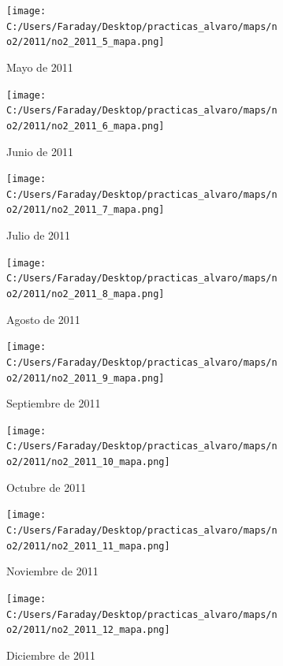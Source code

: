 \documentclass[12pt]{article}
\begin{document}
\newpage

\begin{figure}[H]
\centering
\begin{subfigure}[h]{0.45\textwidth}
\texttt{[image: C:/Users/Faraday/Desktop/practicas\_alvaro/maps/no2/2011/no2\_2011\_5\_mapa.png]}
\caption{Mayo de 2011}
\label{fig:map-mon-1-5-2011}
\end{subfigure}
%
\begin{subfigure}[H]{0.45\textwidth}
\texttt{[image: C:/Users/Faraday/Desktop/practicas\_alvaro/maps/no2/2011/no2\_2011\_6\_mapa.png]}
\caption{Junio de 2011}
\label{fig:map-mon-1-6-2011}
\end{subfigure}
\caption{}
\end{figure}

\begin{figure}[H]
\centering
\begin{subfigure}[h]{0.45\textwidth}
\texttt{[image: C:/Users/Faraday/Desktop/practicas\_alvaro/maps/no2/2011/no2\_2011\_7\_mapa.png]}
\caption{Julio de 2011}
\label{fig:map-mon-1-7-2011}
\end{subfigure}
%
\begin{subfigure}[H]{0.45\textwidth}
\texttt{[image: C:/Users/Faraday/Desktop/practicas\_alvaro/maps/no2/2011/no2\_2011\_8\_mapa.png]}
\caption{Agosto de 2011}
\label{fig:map-mon-1-8-2011}
\end{subfigure}
\caption{}
\end{figure}

\begin{figure}[H]
\centering
\begin{subfigure}[h]{0.45\textwidth}
\texttt{[image: C:/Users/Faraday/Desktop/practicas\_alvaro/maps/no2/2011/no2\_2011\_9\_mapa.png]}
\caption{Septiembre de 2011}
\label{fig:map-mon-1-9-2011}
\end{subfigure}
%
\begin{subfigure}[H]{0.45\textwidth}
\texttt{[image: C:/Users/Faraday/Desktop/practicas\_alvaro/maps/no2/2011/no2\_2011\_10\_mapa.png]}
\caption{Octubre de 2011}
\label{fig:map-mon-1-10-2011}
\end{subfigure}
\caption{}
\end{figure}

\newpage

\begin{figure}[H]
\centering
\begin{subfigure}[h]{0.45\textwidth}
\texttt{[image: C:/Users/Faraday/Desktop/practicas\_alvaro/maps/no2/2011/no2\_2011\_11\_mapa.png]}
\caption{Noviembre de 2011}
\label{fig:map-mon-1-11-2011}
\end{subfigure}
%
\begin{subfigure}[H]{0.45\textwidth}
\texttt{[image: C:/Users/Faraday/Desktop/practicas\_alvaro/maps/no2/2011/no2\_2011\_12\_mapa.png]}
\caption{Diciembre de 2011}
\label{fig:map-mon-1-12-2011}
\end{subfigure}
\caption{}
\end{figure}
\end{document}
